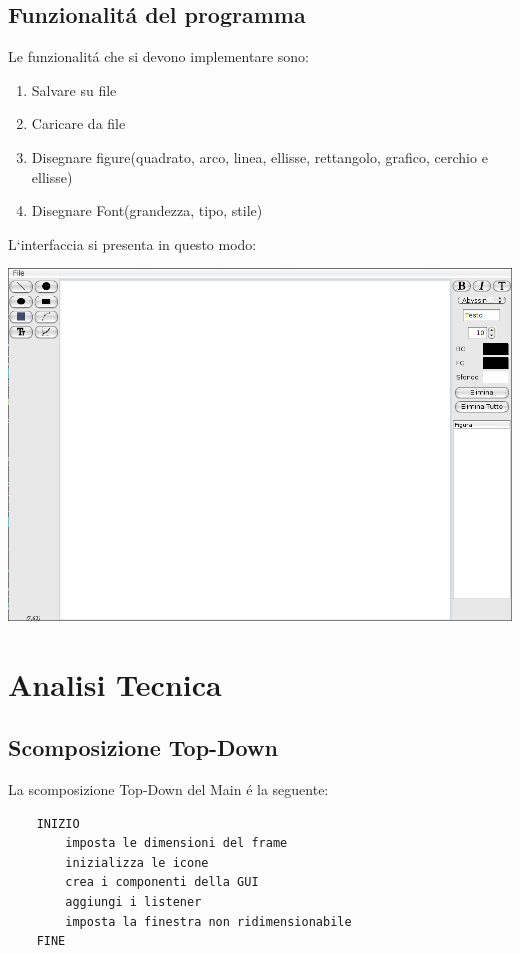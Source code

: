 \documentclass[a4paper,12pt,times,numbered,print,index]{article}
\begin{document}
\subsection{Funzionalitá del programma}
Le funzionalitá che si devono implementare sono:
\begin{enumerate}
	\item Salvare su file
	\item Caricare da file
	\item Disegnare figure(quadrato, arco, linea, ellisse, rettangolo, grafico, cerchio e ellisse)
	\item Disegnare Font(grandezza, tipo,  stile)
\end{enumerate}


L`interfaccia si presenta in questo modo:\\
\begin{center}
\includegraphics[scale=0.4]{Immagini/GUI.png}
\end{center}

\section{Analisi Tecnica}

\subsection{Scomposizione Top-Down} \label{TopDown}
La scomposizione Top-Down del Main é la seguente:
\begin{lstlisting}
	INIZIO
		imposta le dimensioni del frame
		inizializza le icone
		crea i componenti della GUI
		aggiungi i listener
		imposta la finestra non ridimensionabile
	FINE
\end{lstlisting}
\end{document}
